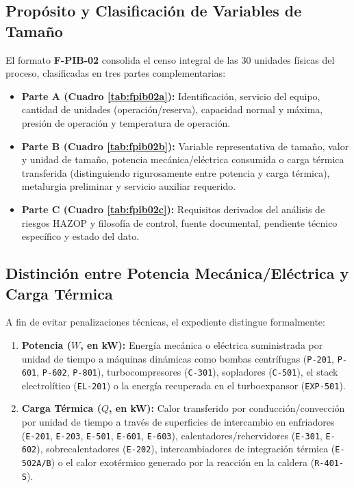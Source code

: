 \documentclass[10pt,letterpaper]{article}
\begin{document}
\subsection{Propósito y Clasificación de Variables de Tamaño}
El formato \textbf{F-PIB-02} consolida el censo integral de las 30 unidades físicas del proceso, clasificadas en tres partes complementarias:
\begin{itemize}
    \item \textbf{Parte A (Cuadro \ref{tab:fpib02a}):} Identificación, servicio del equipo, cantidad de unidades (operación/reserva), capacidad normal y máxima, presión de operación y temperatura de operación.
    \item \textbf{Parte B (Cuadro \ref{tab:fpib02b}):} Variable representativa de tamaño, valor y unidad de tamaño, potencia mecánica/eléctrica consumida o carga térmica transferida (distinguiendo rigurosamente entre potencia y carga térmica), metalurgia preliminar y servicio auxiliar requerido.
    \item \textbf{Parte C (Cuadro \ref{tab:fpib02c}):} Requisitos derivados del análisis de riesgos HAZOP y filosofía de control, fuente documental, pendiente técnico específico y estado del dato.
\end{itemize}

\subsection{Distinción entre Potencia Mecánica/Eléctrica y Carga Térmica}
A fin de evitar penalizaciones técnicas, el expediente distingue formalmente:
\begin{enumerate}
    \item \textbf{Potencia ($W$, en kW):} Energía mecánica o eléctrica suministrada por unidad de tiempo a máquinas dinámicas como bombas centrífugas (\texttt{P-201}, \texttt{P-601}, \texttt{P-602}, \texttt{P-801}), turbocompresores (\texttt{C-301}), sopladores (\texttt{C-501}), el stack electrolítico (\texttt{EL-201}) o la energía recuperada en el turboexpansor (\texttt{EXP-501}).
    \item \textbf{Carga Térmica ($Q$, en kW):} Calor transferido por conducción/convección por unidad de tiempo a través de superficies de intercambio en enfriadores (\texttt{E-201}, \texttt{E-203}, \texttt{E-501}, \texttt{E-601}, \texttt{E-603}), calentadores/rehervidores (\texttt{E-301}, \texttt{E-602}), sobrecalentadores (\texttt{E-202}), intercambiadores de integración térmica (\texttt{E-502A/B}) o el calor exotérmico generado por la reacción en la caldera (\texttt{R-401-S}).
\end{enumerate}
\end{document}

